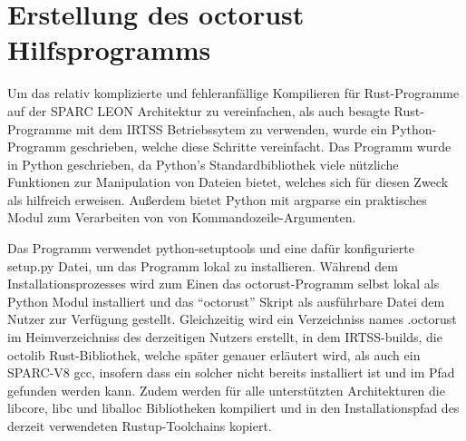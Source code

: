 \section{Erstellung des octorust Hilfsprogramms}

Um das relativ komplizierte und fehleranfällige Kompilieren für Rust-Programme auf der SPARC LEON Architektur zu vereinfachen, als
auch besagte Rust-Programme mit dem IRTSS Betriebssytem zu verwenden, wurde ein Python-Programm geschrieben, welche diese Schritte
vereinfacht. Das Programm wurde in Python geschrieben, da Python's Standardbibliothek viele nützliche Funktionen zur Manipulation
von Dateien bietet, welches sich für diesen Zweck als hilfreich erweisen. Außerdem bietet Python mit argparse ein
praktisches Modul zum Verarbeiten von von Kommandozeile-Argumenten.

Das Programm verwendet python-setuptools und eine dafür konfigurierte setup.py Datei, um das Programm lokal zu installieren.
Während dem Installationsprozesses wird zum Einen das octorust-Programm selbst lokal als Python Modul installiert und das
``octorust'' Skript als ausführbare Datei dem Nutzer zur Verfügung gestellt.
Gleichzeitig wird ein Verzeichniss names .octorust
im Heimverzeichniss des derzeitigen Nutzers erstellt, in dem IRTSS-builds, die octolib Rust-Bibliothek, welche später 
genauer erläutert wird, als auch ein SPARC-V8 gcc, insofern dass ein
solcher nicht bereits installiert ist und im Pfad gefunden werden kann.
Zudem werden für alle unterstützten Architekturen die libcore, libc und liballoc Bibliotheken kompiliert und in den
Installationspfad des derzeit verwendeten Rustup-Toolchains kopiert.

